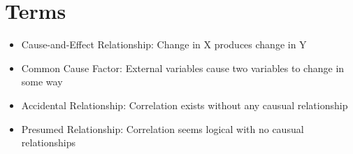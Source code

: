 \documentclass{article}
\begin{document}
\section{Terms}
\begin{itemize}
    \item Cause-and-Effect Relationship: Change in X produces change in Y
    \item Common Cause Factor: External variables cause two variables to change in some way
    \item Accidental Relationship: Correlation exists without any causual relationship
    \item Presumed Relationship: Correlation seems logical with no causual relationships
\end{itemize}
\end{document}
